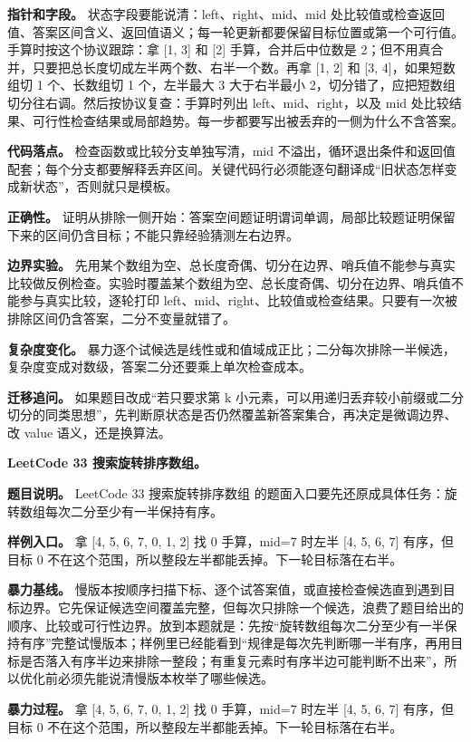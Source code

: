 \textbf{指针和字段。} 状态字段要能说清：left、right、mid、mid 处比较值或检查返回值、答案区间含义、返回值语义；每一轮更新都要保留目标位置或第一个可行值。手算时按这个协议跟踪：拿 [1, 3] 和 [2] 手算，合并后中位数是 2；但不用真合并，只要把总长度切成左半两个数、右半一个数。再拿 [1, 2] 和 [3, 4]，如果短数组切 1 个、长数组切 1 个，左半最大 3 大于右半最小 2，切分错了，应把短数组切分往右调。然后按协议复查：手算时列出 left、mid、right，以及 mid 处比较结果、可行性检查结果或局部趋势。每一步都要写出被丢弃的一侧为什么不含答案。

\textbf{代码落点。} 检查函数或比较分支单独写清，mid 不溢出，循环退出条件和返回值配套；每个分支都要解释丢弃区间。关键代码行必须能逐句翻译成“旧状态怎样变成新状态”，否则就只是模板。

\textbf{正确性。} 证明从排除一侧开始：答案空间题证明谓词单调，局部比较题证明保留下来的区间仍含目标；不能只靠经验猜测左右边界。

\textbf{边界实验。} 先用某个数组为空、总长度奇偶、切分在边界、哨兵值不能参与真实比较做反例检查。实验时覆盖某个数组为空、总长度奇偶、切分在边界、哨兵值不能参与真实比较，逐轮打印 left、mid、right、比较值或检查结果。只要有一次被排除区间仍含答案，二分不变量就错了。

\textbf{复杂度变化。} 暴力逐个试候选是线性或和值域成正比；二分每次排除一半候选，复杂度变成对数级，答案二分还要乘上单次检查成本。

\textbf{迁移追问。} 如果题目改成“若只要求第 k 小元素，可以用递归丢弃较小前缀或二分切分的同类思想”，先判断原状态是否仍然覆盖新答案集合，再决定是微调边界、改 value 语义，还是换算法。

\noindent\textbf{LeetCode 33 搜索旋转排序数组。}

\textbf{题目说明。} LeetCode 33 搜索旋转排序数组 的题面入口要先还原成具体任务：旋转数组每次二分至少有一半保持有序。

\textbf{样例入口。} 拿 [4, 5, 6, 7, 0, 1, 2] 找 0 手算，mid=7 时左半 [4, 5, 6, 7] 有序，但目标 0 不在这个范围，所以整段左半都能丢掉。下一轮目标落在右半。

\textbf{暴力基线。} 慢版本按顺序扫描下标、逐个试答案值，或直接检查候选直到遇到目标边界。它先保证候选空间覆盖完整，但每次只排除一个候选，浪费了题目给出的顺序、比较或可行性边界。放到本题就是：先按“旋转数组每次二分至少有一半保持有序”完整试慢版本；样例里已经能看到“规律是每次先判断哪一半有序，再用目标是否落入有序半边来排除一整段；有重复元素时有序半边可能判断不出来”，所以优化前必须先能说清慢版本枚举了哪些候选。

\textbf{暴力过程。} 拿 [4, 5, 6, 7, 0, 1, 2] 找 0 手算，mid=7 时左半 [4, 5, 6, 7] 有序，但目标 0 不在这个范围，所以整段左半都能丢掉。下一轮目标落在右半。

